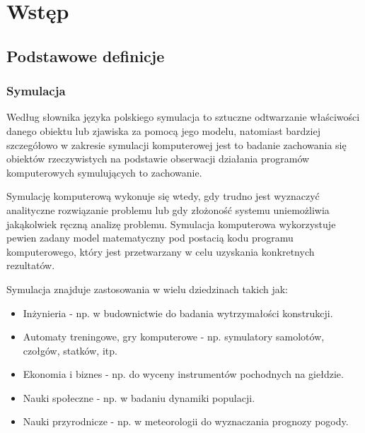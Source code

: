 \documentclass[12pt, oneside]{report}
\theoremstyle{definition}
\begin{document}
\vspace{\fill}

\newpage
\pagestyle{plain}
\setcounter{page}{6}
\tableofcontents

\newpage
\pagestyle{headings}

\renewcommand*{\arraystretch}{1.5}

\chapter{Wstęp}
\section{Podstawowe definicje}
\subsection{Symulacja}
Według słownika języka polskiego \cite{PWNSymulacja} symulacja to sztuczne odtwarzanie właściwości danego obiektu lub zjawiska za pomocą jego modelu, natomiast bardziej szczegółowo w zakresie symulacji komputerowej jest to badanie zachowania się obiektów rzeczywistych na podstawie obserwacji działania programów komputerowych symulujących to zachowanie.


Symulację komputerową wykonuje się wtedy, gdy trudno jest wyznaczyć analityczne rozwiązanie problemu lub gdy złożoność systemu uniemożliwia jakąkolwiek ręczną analizę problemu. Symulacja komputerowa wykorzystuje pewien zadany model matematyczny pod postacią kodu programu komputerowego, który jest przetwarzany w celu uzyskania konkretnych rezultatów.

Symulacja znajduje zastosowania w wielu dziedzinach takich jak:
\begin{itemize}
\item Inżynieria - np. w budownictwie do badania wytrzymałości konstrukcji.
\item Automaty treningowe, gry komputerowe - np. symulatory samolotów, czołgów, statków, itp.
\item Ekonomia i biznes - np. do wyceny instrumentów pochodnych na giełdzie. 
\item Nauki społeczne - np. w badaniu dynamiki populacji.
\item Nauki przyrodnicze - np. w meteorologii do wyznaczania prognozy pogody.
\end{itemize}
\end{document}
